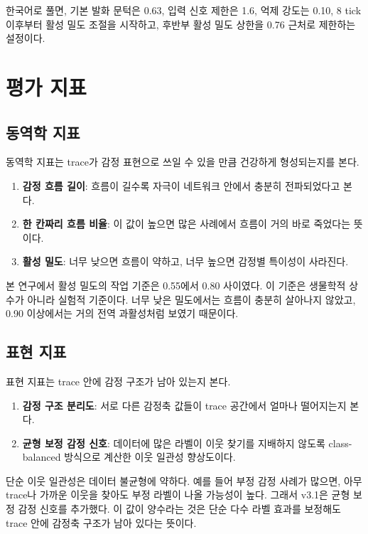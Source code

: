 \documentclass[11pt,a4paper]{article}
\begin{document}
한국어로 풀면, 기본 발화 문턱은 0.63, 입력 신호 제한은 1.6, 억제 강도는 0.10, 8 tick 이후부터 활성 밀도 조절을 시작하고, 후반부 활성 밀도 상한을 0.76 근처로 제한하는 설정이다.

\section{평가 지표}

\subsection{동역학 지표}

동역학 지표는 trace가 감정 표현으로 쓰일 수 있을 만큼 건강하게 형성되는지를 본다.

\begin{enumerate}
  \item \textbf{감정 흐름 길이}: 흐름이 길수록 자극이 네트워크 안에서 충분히 전파되었다고 본다.
  \item \textbf{한 칸짜리 흐름 비율}: 이 값이 높으면 많은 사례에서 흐름이 거의 바로 죽었다는 뜻이다.
  \item \textbf{활성 밀도}: 너무 낮으면 흐름이 약하고, 너무 높으면 감정별 특이성이 사라진다.
\end{enumerate}

본 연구에서 활성 밀도의 작업 기준은 0.55에서 0.80 사이였다. 이 기준은 생물학적 상수가 아니라 실험적 기준이다. 너무 낮은 밀도에서는 흐름이 충분히 살아나지 않았고, 0.90 이상에서는 거의 전역 과활성처럼 보였기 때문이다.

\subsection{표현 지표}

표현 지표는 trace 안에 감정 구조가 남아 있는지 본다.

\begin{enumerate}
  \item \textbf{감정 구조 분리도}: 서로 다른 감정축 값들이 trace 공간에서 얼마나 떨어지는지 본다.
  \item \textbf{균형 보정 감정 신호}: 데이터에 많은 라벨이 이웃 찾기를 지배하지 않도록 class-balanced 방식으로 계산한 이웃 일관성 향상도이다.
\end{enumerate}

단순 이웃 일관성은 데이터 불균형에 약하다. 예를 들어 부정 감정 사례가 많으면, 아무 trace나 가까운 이웃을 찾아도 부정 라벨이 나올 가능성이 높다. 그래서 v3.1은 균형 보정 감정 신호를 추가했다. 이 값이 양수라는 것은 단순 다수 라벨 효과를 보정해도 trace 안에 감정축 구조가 남아 있다는 뜻이다.
\end{document}
